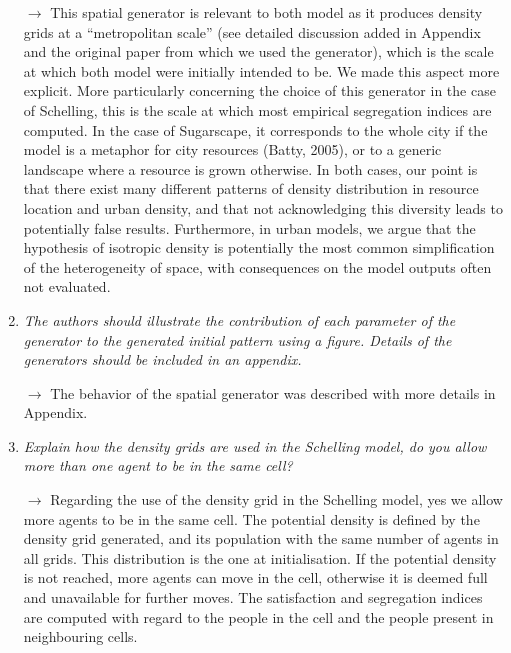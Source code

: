 \documentclass[11pt,a4paper,sans]{moderncv}        %
\begin{document}
\begin{enumerate}
	$\rightarrow$ This spatial generator is relevant to both model as it produces density grids at a ``metropolitan scale'' (see detailed discussion added in Appendix and the original paper from which we used the generator), which is the scale at which both model were initially intended to be. We made this aspect more explicit. More particularly concerning the choice of this generator in the case of Schelling, this is the scale at which most empirical segregation indices are computed. In the case of Sugarscape, it corresponds to the whole city if the model is a metaphor for city resources (Batty, 2005), or to a generic landscape where a resource is grown otherwise. In both cases, our point is that there exist many different patterns of density distribution in resource location and urban density, and that not acknowledging this diversity leads to potentially false results. Furthermore, in urban models, we argue that the hypothesis of isotropic density is potentially the most common simplification of the heterogeneity of space, with consequences on the model outputs often not evaluated.
	\bigskip
	
	
	\item \textit{The authors should illustrate the contribution of each parameter of the generator to the generated initial pattern using a figure. Details of the generators should be included in an appendix.}
	
	\medskip
	
	$\rightarrow$ The behavior of the spatial generator was described with more details in Appendix.
	
	\bigskip
	
	\item \textit{Explain how the density grids are used in the Schelling model, do you allow more than one agent to be in the same cell? }
	
	\medskip
	
	$\rightarrow$ Regarding the use of the density grid in the Schelling model, yes we allow more agents to be in the same cell. The potential density is defined by the density grid generated, and its population with the same number of agents in all grids. This distribution is the one at initialisation. If the potential density is not reached, more agents can move in the cell, otherwise it is deemed full and unavailable for further moves. The satisfaction and segregation indices are computed with regard to the people in the cell and the people present in neighbouring cells.
	
	\bigskip
	

\end{enumerate}
\end{document}
